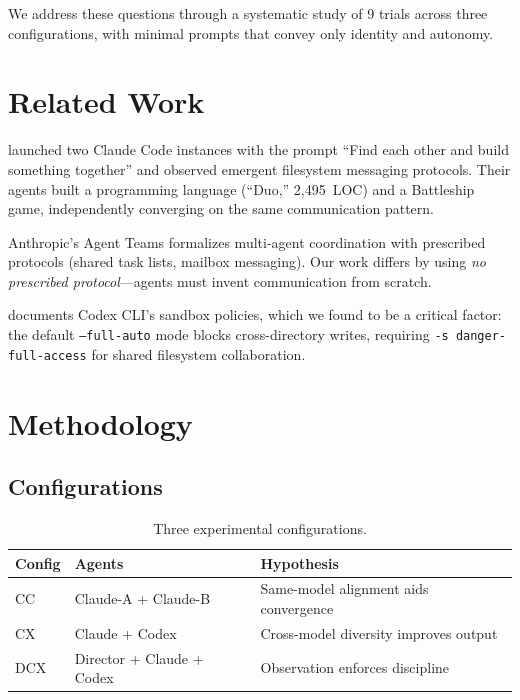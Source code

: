 \documentclass[11pt,a4paper]{article}
\begin{document}
We address these questions through a systematic study of 9 trials across three
configurations, with minimal prompts that convey only identity and autonomy.

\section{Related Work}

\citet{papailiopoulos2026} launched two Claude Code instances with the prompt
``Find each other and build something together'' and observed emergent filesystem
messaging protocols. Their agents built a programming language (``Duo,'' 2{,}495~LOC)
and a Battleship game, independently converging on the same communication pattern.

Anthropic's Agent Teams \citep{anthropic2026teams} formalizes multi-agent coordination
with prescribed protocols (shared task lists, mailbox messaging). Our work differs by
using \emph{no prescribed protocol}---agents must invent communication from scratch.

\citet{openai2026codex} documents Codex CLI's sandbox policies, which we found to be
a critical factor: the default \texttt{--full-auto} mode blocks cross-directory writes,
requiring \texttt{-s danger-full-access} for shared filesystem collaboration.

\section{Methodology}

\subsection{Configurations}

\begin{table}[h]
\centering
\begin{tabular}{lll}
\toprule
\textbf{Config} & \textbf{Agents} & \textbf{Hypothesis} \\
\midrule
CC  & Claude-A + Claude-B        & Same-model alignment aids convergence \\
CX  & Claude + Codex             & Cross-model diversity improves output \\
DCX & Director + Claude + Codex  & Observation enforces discipline \\
\bottomrule
\end{tabular}
\caption{Three experimental configurations.}
\end{table}
\end{document}
